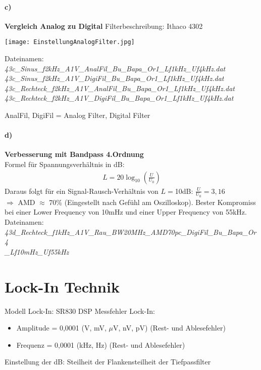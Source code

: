 \paragraph{c)}\textbf{Vergleich Analog zu Digital}
Filterbeschreibung: Ithaco 4302
\begin{center}
    \texttt{[image: EinstellungAnalogFilter.jpg]}
    \label{image:analogFilter}
\end{center}
Dateinamen:\\
\textit{43c\_Sinus\_f2kHz\_A1V\_AnalFil\_Bu\_Bapa\_Or1\_Lf1kHz\_Uf4kHz.dat}\\
\textit{43c\_Sinus\_f2kHz\_A1V\_DigiFil\_Bu\_Bapa\_Or1\_Lf1kHz\_Uf4kHz.dat}\\
\textit{43c\_Rechteck\_f2kHz\_A1V\_AnalFil\_Bu\_Bapa\_Or1\_Lf1kHz\_Uf4kHz.dat}\\
\textit{43c\_Rechteck\_f2kHz\_A1V\_DigiFil\_Bu\_Bapa\_Or1\_Lf1kHz\_Uf4kHz.dat}

AnalFil, DigiFil = Analog Filter, Digital Filter

\paragraph{d)}\textbf{Verbesserung mit Bandpass 4.Ordnung}\\
Formel für Spannungsverhältnis in dB:
\begin{gather}
    L = 20 \log_{10}\left(\frac{U}{U_0}\right)
\end{gather}
Daraus folgt für ein Signal-Rausch-Verhältnis von $L=$10dB: $\frac{U}{U_0} = 3,16$\\
$\Rightarrow$ AMD $\approx$ 70\% (Eingestellt nach Gefühl am Oszilloskop). Bester Kompromiss bei einer Lower Frequency von 10mHz und einer Upper Frequency von 55kHz.\\
Dateinamen:\\
\textit{43d\_Rechteck\_f1kHz\_A1V\_Rau\_BW20MHz\_AMD70pc\_DigiFil\_Bu\_Bapa\_Or4\\
\_Lf10mHz\_Uf55kHz}
\newpage
\section*{Lock-In Technik}
Modell Lock-In: SR830 DSP
Messfehler Lock-In:
\begin{itemize}
    \item Amplitude = 0,0001 (V, mV, $\mu$V, nV, pV) (Rest- und Ablesefehler)
    \item Frequenz = 0,0001 (kHz, Hz) (Rest- und Ablesefehler)
\end{itemize}
Einstellung der dB: Steilheit der Flankensteilheit der Tiefpassfilter
